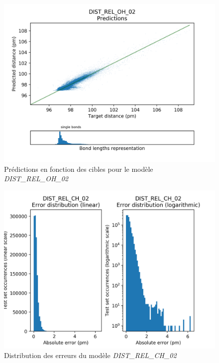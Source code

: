 \begin{figure}[!h]
	\centering
	
	\includegraphics[scale=0.8]{../figures/DIST_REL_OH_02/DIST_REL_OH_02_preds_targets.png}	
	
	\caption{Prédictions en fonction des cibles pour le modèle \emph{DIST\_REL\_OH\_02}}
	
\end{figure}
	
	

\begin{figure}[!h]
	\centering
	
	\includegraphics[scale=0.8]{../figures/DIST_REL_CH_02/DIST_REL_CH_02_distrib_rmse_val.png}	
	
	\caption{Distribution des erreurs du modèle \emph{DIST\_REL\_CH\_02}}
\end{figure}


